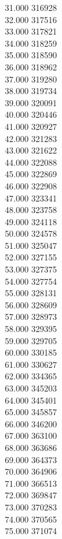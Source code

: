 { 31.000	316928 \\
 32.000	317516 \\
 33.000	317821 \\
 34.000	318259 \\
 35.000	318590 \\
 36.000	318962 \\
 37.000	319280 \\
 38.000	319734 \\
 39.000	320091 \\
 40.000	320446 \\
 41.000	320927 \\
 42.000	321283 \\
 43.000	321622 \\
 44.000	322088 \\
 45.000	322869 \\
 46.000	322908 \\
 47.000	323341 \\
 48.000	323758 \\
 49.000	324118 \\
 50.000	324578 \\
 51.000	325047 \\
 52.000	327155 \\
 53.000	327375 \\
 54.000	327754 \\
 55.000	328131 \\
 56.000	328609 \\
 57.000	328973 \\
 58.000	329395 \\
 59.000	329705 \\
 60.000	330185 \\
 61.000	330627 \\
 62.000	334365 \\
 63.000	345203 \\
 64.000	345401 \\
 65.000	345857 \\
 66.000	346200 \\
 67.000	363100 \\
 68.000	363686 \\
 69.000	364373 \\
 70.000	364906 \\
 71.000	366513 \\
 72.000	369847 \\
 73.000	370283 \\
 74.000	370565 \\
 75.000	371074 \\
}
